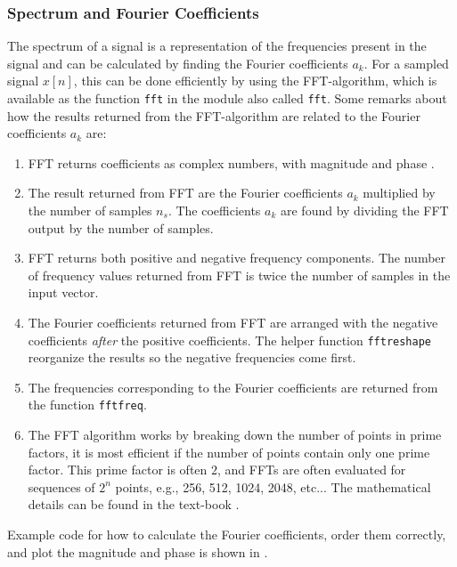 \subsubsection{Spectrum and Fourier Coefficients}
The spectrum of a signal is a representation of the frequencies present in the signal and can be calculated by finding the Fourier coefficients $a_k$. For a sampled signal $x[n]$, this can be done efficiently by using the FFT-algorithm, which is available as the function \verb|fft| in the \scipy module also called \verb|fft|. 
Some  remarks about how the results returned from the FFT-algorithm are related to the Fourier coefficients $a_k$ are:
\begin{enumerate}[1.]

\item FFT returns coefficients as complex numbers, with magnitude and phase .
	
\item The result returned from FFT are the Fourier coefficients $a_k$ multiplied by the number of samples $n_s$. 
	The coefficients $a_k$ are found by dividing the FFT output by the number of samples. 
	
\item FFT returns both positive and negative frequency components. The number of frequency values returned from FFT is twice the number of samples in the input vector.

\item The Fourier coefficients returned from FFT are arranged with the negative coefficients \emph{after} the positive coefficients. The helper function \verb|fftreshape| reorganize the results so the negative frequencies come first.

\item  The frequencies corresponding to the Fourier coefficients are returned from the function \verb|fftfreq|.

\item The FFT algorithm works by breaking down the number of points in prime factors, it is most efficient if the number of points contain only one prime factor.
This prime factor is often $2$, and FFTs are often evaluated for sequences of $2^n$ points, e.g., 256, 512, 1024, 2048, etc...
The mathematical details can be found in the text-book \cite{mcclellan_dsp_2016}.
	
\end{enumerate}

Example code for how to calculate the Fourier coefficients, order them correctly, and plot the magnitude and phase is shown in .

